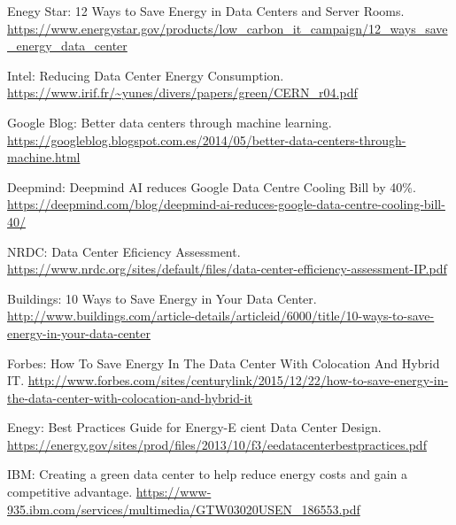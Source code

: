 \documentclass[10pt]{article}
\begin{document}
  \begin{thebibliography}{9}

		Enegy Star: 12 Ways to Save Energy in Data Centers and Server Rooms. \newline \url{https://www.energystar.gov/products/low_carbon_it_campaign/12_ways_save_energy_data_center}

    Intel: Reducing Data Center Energy Consumption. \newline
 		\url{https://www.irif.fr/~yunes/divers/papers/green/CERN_r04.pdf}

    Google Blog: Better data centers through machine learning. \newline
		\url{https://googleblog.blogspot.com.es/2014/05/better-data-centers-through-machine.html}

    Deepmind: Deepmind AI reduces Google Data Centre Cooling Bill by 40\%. \newline
		\url{https://deepmind.com/blog/deepmind-ai-reduces-google-data-centre-cooling-bill-40/}

    NRDC: Data Center Eficiency Assessment. \newline
 		\url{https://www.nrdc.org/sites/default/files/data-center-efficiency-assessment-IP.pdf}

    Buildings: 10 Ways to Save Energy in Your Data Center. \newline \url{http://www.buildings.com/article-details/articleid/6000/title/10-ways-to-save-energy-in-your-data-center}

		Forbes: How To Save Energy In The Data Center With Colocation And Hybrid IT. \newline \url{http://www.forbes.com/sites/centurylink/2015/12/22/how-to-save-energy-in-the-data-center-with-colocation-and-hybrid-it}

		Enegy: Best Practices Guide for Energy-E cient Data Center Design. \newline
		\url{https://energy.gov/sites/prod/files/2013/10/f3/eedatacenterbestpractices.pdf}

		IBM: Creating a green data center to help reduce energy costs and gain a competitive advantage. \newline
		\url{https://www-935.ibm.com/services/multimedia/GTW03020USEN_186553.pdf}


\end{thebibliography}
\end{document}
